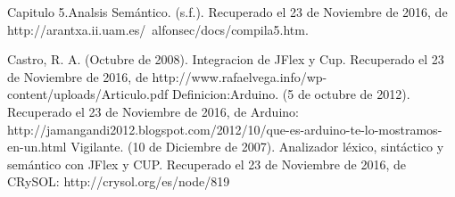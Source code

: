\documentclass[11pt,twocolumn,spanish]{article}
\begin{document}
\begin{thebibliography}{5}
 Capitulo 5.Analsis Semántico. (s.f.). Recuperado el 23 de Noviembre de 2016, de http://arantxa.ii.uam.es/~alfonsec/docs/compila5.htm.

 Castro, R. A. (Octubre de 2008). Integracion de JFlex y Cup. Recuperado el 23 de Noviembre de 2016, de http://www.rafaelvega.info/wp-content/uploads/Articulo.pdf
Definicion:Arduino. (5 de octubre de 2012). Recuperado el 23 de Noviembre de 2016, de Arduino: http://jamangandi2012.blogspot.com/2012/10/que-es-arduino-te-lo-mostramos-en-un.html
Vigilante. (10 de Diciembre de 2007). Analizador léxico, sintáctico y semántico con JFlex y CUP. Recuperado el 23 de Noviembre de 2016, de CRySOL: http://crysol.org/es/node/819

\end{thebibliography}
\end{document}
